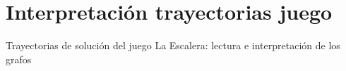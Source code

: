 \documentclass{book}
\begin{document}









\chapter{Interpretación trayectorias juego}{Trayectorias de solución del juego La Escalera: lectura e interpretación de los grafos}
\end{document}
